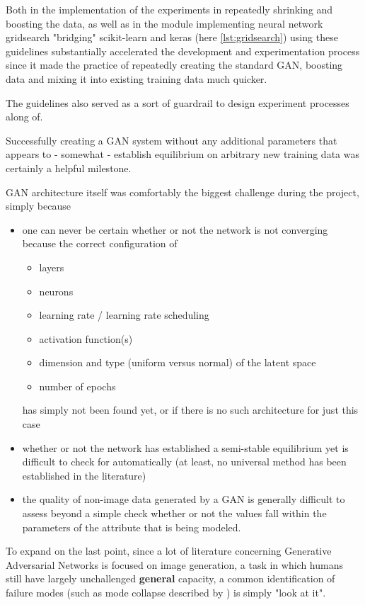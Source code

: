 Both in the implementation of the experiments in repeatedly shrinking and boosting the data, as well as in the module implementing neural network gridsearch "bridging" scikit-learn and keras (here \ref{lst:gridsearch}) using these guidelines substantially accelerated the development and experimentation process since it made the practice of repeatedly creating the standard \ac{GAN}, boosting data and mixing it into existing training data much quicker.

The guidelines also served as a sort of guardrail to design experiment processes along of. 

Successfully creating a \ac{GAN} system without any additional parameters that appears to - somewhat - establish equilibrium on arbitrary new training data was certainly a helpful milestone.

\pagebreak

\ac{GAN} architecture itself was comfortably the biggest challenge during the project, simply because 
\begin{itemize}
	\item one can never be certain whether or not the network is not converging because the correct configuration of 
	\begin{itemize}
		\item layers
		\item neurons
		\item learning rate / learning rate scheduling
		\item activation function(s)
		\item dimension and type (uniform versus normal) of the latent space
		\item number of epochs
	\end{itemize} has simply not been found yet, or if there is no such architecture for just this case
	\item whether or not the network has established a semi-stable equilibrium yet is difficult to check for automatically (at least, no universal method has been established in the literature)
	\item the quality of non-image data generated by a \ac{GAN} is generally difficult to assess beyond a simple check whether or not the values fall within the parameters of the attribute that is being modeled.
\end{itemize}

To expand on the last point, since a lot of literature concerning Generative Adversarial Networks is focused on image generation, a task in which humans still have largely unchallenged \textbf{general} capacity, a common identification of failure modes (such as mode collapse described by \cite{mode_collapse}) is simply "look at it". 

